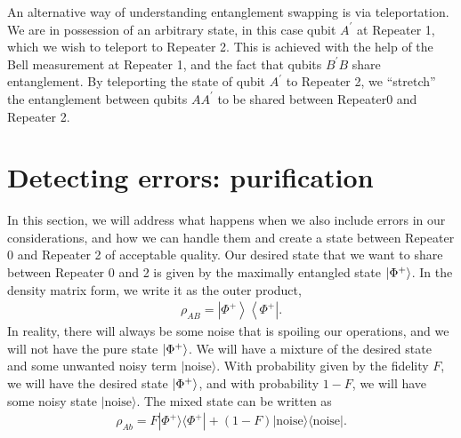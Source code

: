 An alternative way of understanding entanglement swapping is via teleportation.
We are in possession of an arbitrary state, in this case qubit $A^{\prime}$ at Repeater 1, which we wish to teleport to Repeater 2.
This is achieved with the help of the Bell measurement at Repeater 1, and the fact that qubits $B^{\prime}B$ share entanglement.
By teleporting the state of qubit $A^{\prime}$ to Repeater 2, we ``stretch'' the entanglement between qubits $AA^{\prime}$ to be shared between Repeater0 and Repeater 2.


\section{Detecting errors: purification}
\label{sec:12-4_purification}

In this section, we will address what happens when we also include errors in our considerations, and how we can handle them and create a state between Repeater 0 and Repeater 2 of acceptable quality.
Our desired state that we want to share between Repeater 0 and 2 is given by the maximally entangled state $\left| \Phi^+ \right\rangle$.
In the density matrix form, we write it as the outer product,
\begin{align}
    \rho_{AB} = \left|\Phi^{+}\right\rangle\left\langle\Phi^{+}\right|.
\end{align}
In reality, there will always be some noise that is spoiling our operations, and we will not have the pure state $\left| \Phi^+ \right\rangle$.
We will have a mixture of the desired state and some unwanted noisy term $|\text{noise}\rangle$.
With probability given by the fidelity $F$, we will have the desired state $\left| \Phi^+ \right\rangle$, and with probability $1-F$, we will have some noisy state $|\text{noise}\rangle$.
The mixed state can be written as
\begin{align}
    \rho_{Ab} = F |\Phi^{+}\rangle\langle\Phi^{+}|+(1-F)| \text {noise}\rangle\langle\text {noise}|.
\end{align}

